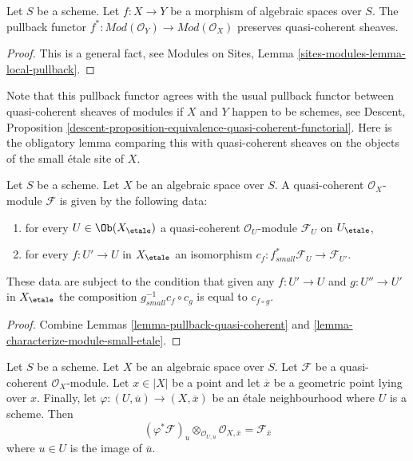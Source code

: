 \begin{lemma}
\label{lemma-pullback-quasi-coherent}
Let $S$ be a scheme.
Let $f : X \to Y$ be a morphism of algebraic spaces over $S$.
The pullback functor
$f^* : \textit{Mod}(\mathcal{O}_Y) \to \textit{Mod}(\mathcal{O}_X)$
preserves quasi-coherent sheaves.
\end{lemma}

\begin{proof}
This is a general fact, see
Modules on Sites, Lemma \ref{sites-modules-lemma-local-pullback}.
\end{proof}

\noindent
Note that this pullback functor agrees with the usual pullback functor
between quasi-coherent sheaves of modules if $X$ and $Y$ happen to be
schemes, see
Descent, Proposition
\ref{descent-proposition-equivalence-quasi-coherent-functorial}.
Here is the obligatory lemma comparing this with quasi-coherent sheaves
on the objects of the small \'etale site of $X$.

\begin{lemma}
\label{lemma-characterize-quasi-coherent-small-etale}
Let $S$ be a scheme. Let $X$ be an algebraic space over $S$.
A quasi-coherent $\mathcal{O}_X$-module $\mathcal{F}$
is given by the following data:
\begin{enumerate}
\item for every $U \in \Ob(X_\etale)$ a quasi-coherent
$\mathcal{O}_U$-module $\mathcal{F}_U$ on $U_\etale$,
\item for every $f : U' \to U$ in $X_\etale$ an isomorphism
$c_f : f_{small}^*\mathcal{F}_U \to \mathcal{F}_{U'}$.
\end{enumerate}
These data are subject to the condition that given any $f : U' \to U$
and $g : U'' \to U'$ in $X_\etale$ the composition
$g_{small}^{-1}c_f \circ c_g$ is equal to $c_{f \circ g}$.
\end{lemma}

\begin{proof}
Combine Lemmas \ref{lemma-pullback-quasi-coherent} and
\ref{lemma-characterize-module-small-etale}.
\end{proof}

\begin{lemma}
\label{lemma-stalk-quasi-coherent}
Let $S$ be a scheme.
Let $X$ be an algebraic space over $S$.
Let $\mathcal{F}$ be a quasi-coherent $\mathcal{O}_X$-module.
Let $x \in |X|$ be a point and let $\overline{x}$ be a geometric
point lying over $x$. Finally, let
$\varphi : (U, \overline{u}) \to (X, \overline{x})$
be an \'etale neighbourhood where $U$ is a scheme.
Then
$$
(\varphi^*\mathcal{F})_u \otimes_{\mathcal{O}_{U, u}}
\mathcal{O}_{X, \overline{x}} =
\mathcal{F}_{\overline{x}}
$$
where $u \in U$ is the image of $\overline{u}$.
\end{lemma}


